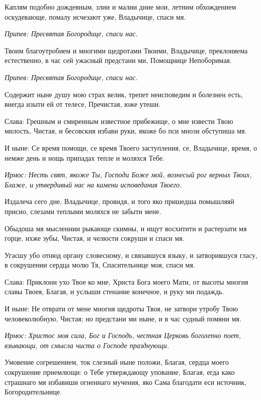 Каплям подобно дождевным, злии и малии дние мои, летним обхождением оскудевающе, помалу исчезают уже, Владычице, спаси мя. 

\itshape Припев:\normalfont{} Пресвятая Богородице, спаси нас. 

Твоим благоутробием и многими щедротами Твоими, Владычице, преклоняема естественно, в час сей ужасный предстани ми, Помощнице Непоборимая. 

\itshape Припев:\normalfont{} Пресвятая Богородице, спаси нас. 

Содержит ныне душу мою страх велик, трепет неисповедим и болезнен есть, внегда изыти ей от телесе, Пречистая, юже утеши. 

Слава: Грешным и смиренным известное прибежище, о мне извести Твою милость, Чистая, и бесовския избави руки, якоже бо пси мнози обступиша мя. 

И ныне: Се время помощи, се время Твоего заступления, се, Владычице, время, о немже день и нощь припадах тепле и моляхся Тебе.




\itshape Ирмос:\normalfont{} Несть свят, якоже Ты, Господи Боже мой, вознесый рог верных Твоих, Блаже, и утвердивый нас на камени исповедания Твоего. 

Издалеча сего дне, Владычице, провидя, и того яко пришедша помышляяй присно, слезами теплыми моляхся не забыти мене. 

Обыдоша мя мысленнии рыкающе скимны, и ищут восхитити и растерзати мя горце, ихже зубы, Чистая, и челюсти сокруши и спаси мя. 

Угасшу убо отнюд органу словесному, и связавшуся языку, и затворившуся гласу, в сокрушении сердца молю Тя, Спасительнице моя, спаси мя. 

Слава: Приклони ухо Твое ко мне, Христа Бога моего Мати, от высоты многия славы Твоея, Благая, и услыши стенание конечное, и руку ми подаждь. 

И ныне: Не отврати от мене многия щедроты Твоя, не затвори утробу Твою человеколюбную, Чистая; но предстани ми ныне, и в час судный помяни мя.




\itshape Ирмос:\normalfont{} Христос моя сила, Бог и Господь, честная Церковь боголепно поет, взывающи, от смысла чиста о Господе празднующи. 

Умовение согрешением, ток слезный ныне положи, Благая, сердца моего сокрушение приемлющи: о Тебе утверждающу упование, Благая, егда како страшнаго мя избавиши огненнаго мучения, яко Сама благодати еси источник, Богородительнице. 

